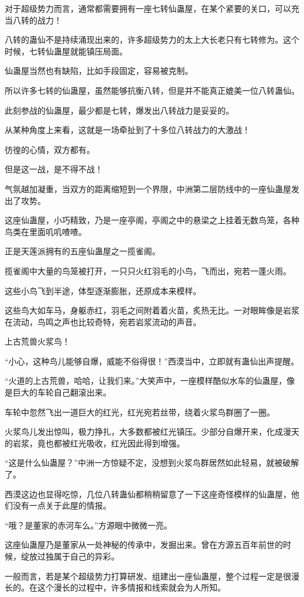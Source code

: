 \begin{this_body}
对于超级势力而言，通常都需要拥有一座七转仙蛊屋，在某个紧要的关口，可以充当八转的战力！

八转的蛊仙不是持续涌现出来的，许多超级势力的太上大长老只有七转修为。这个时候，七转仙蛊屋就能镇压局面。

仙蛊屋当然也有缺陷，比如手段固定，容易被克制。

所以许多七转的仙蛊屋，虽然能够抗衡八转，但是并不能真正媲美一位八转蛊仙。

此刻参战的仙蛊屋，最少都是七转，爆发出八转战力是妥妥的。

从某种角度上来看，这就是一场牵扯到了十多位八转战力的大激战！

彷徨的心情，双方都有。

但是这一战，是不得不战！

气氛越加凝重，当双方的距离缩短到一个界限，中洲第二层防线中的一座仙蛊屋发出了攻势。

这座仙蛊屋，小巧精致，乃是一座亭阁，亭阁之中的悬梁之上挂着无数鸟笼，各种鸟类在里面叽叽喳喳。

正是天莲派拥有的五座仙蛊屋之一揽雀阁。

揽雀阁中大量的鸟笼被打开，一只只火红羽毛的小鸟，飞而出，宛若一蓬火雨。

这些小鸟飞到半途，体型逐渐膨胀，还原成本来模样。

这些鸟大如车马，身躯赤红，羽毛之间附着着火苗，炙热无比。一对眼眸像是岩浆在流动，鸟鸣之声也比较奇特，宛若岩浆流动的声音。

上古荒兽火浆鸟！

“小心，这种鸟儿能够自爆，威能不俗得很！”西漠当中，立即就有蛊仙出声提醒。

“火道的上古荒兽，哈哈，让我们来。”大笑声中，一座模样酷似水车的仙蛊屋，像是巨大的车轮自己翻滚出来。

车轮中忽然飞出一道巨大的红光，红光宛若丝带，绕着火浆鸟群圈了一圈。

火浆鸟儿发出惊叫，极力挣扎，大多数都被红光镇压。少部分自爆开来，化成漫天的岩浆，竟也都被红光吸收，红光因此得到增强。

“这是什么仙蛊屋？”中洲一方惊疑不定，没想到火浆鸟群居然如此轻易，就被破解了。

西漠这边也显得吃惊，几位八转蛊仙都稍稍留意了一下这座奇怪模样的仙蛊屋，他们没有一点关于此屋的情报。

“哦？是董家的赤河车么。”方源眼中微微一亮。

这座仙蛊屋乃是董家从一处神秘的传承中，发掘出来。曾在方源五百年前世的时候，绽放过独属于自己的异彩。

一般而言，若是某个超级势力打算研发、组建出一座仙蛊屋，整个过程一定是很漫长的。在这个漫长的过程中，许多情报和线索就会为人所知。


\end{this_body}

